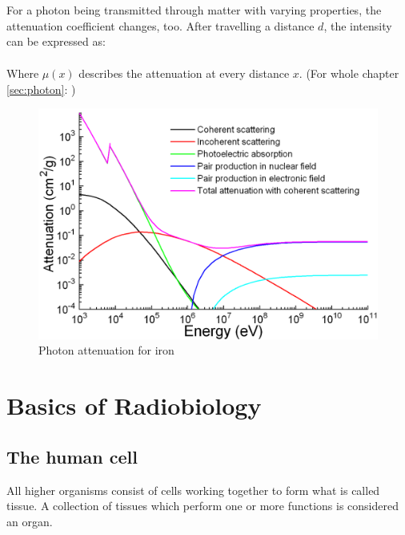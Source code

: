For a photon being transmitted through matter with varying properties, the attenuation coefficient changes, too.
After travelling a distance $d$, the intensity can be expressed as:
\begin{align}
\label{eq:mu_int}
\end{align}

Where $\mu(x)$ describes the attenuation at every distance $x$.
(For whole chapter \ref{sec:photon}: \cite{Podgorsak, Maidment2014})

\begin{figure}[h!]
	\centering
	\includegraphics[width=0.7\linewidth]{../fig/intro/Ironattenuation}
	\caption[Photon attenuation for iron]{Photon attenuation for iron \footnotemark}
	\label{fig:attenuation_iron}
\end{figure}


\section{Basics of Radiobiology}
\label{sec:cell}
\subsection{The human cell}
All higher organisms consist of cells working together to form what is called tissue.
A collection of tissues which perform one or more functions is considered an organ. \\

